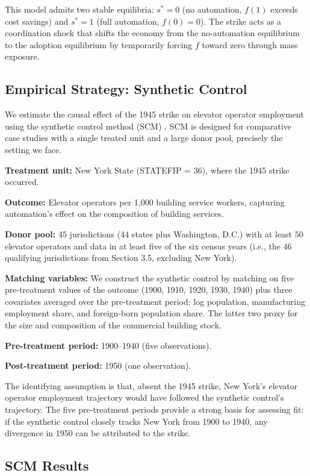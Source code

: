 \documentclass[12pt]{article}
\begin{document}
This model admits two stable equilibria: $s^* = 0$ (no automation, $f(1)$ exceeds cost savings) and $s^* = 1$ (full automation, $f(0) = 0$). The strike acts as a coordination shock that shifts the economy from the no-automation equilibrium to the adoption equilibrium by temporarily forcing $f$ toward zero through mass exposure.

\subsection{Empirical Strategy: Synthetic Control}

We estimate the causal effect of the 1945 strike on elevator operator employment using the synthetic control method (SCM) \citep{abadie2010, abadie2015}. SCM is designed for comparative case studies with a single treated unit and a large donor pool, precisely the setting we face.

\textbf{Treatment unit:} New York State (STATEFIP = 36), where the 1945 strike occurred.

\textbf{Outcome:} Elevator operators per 1,000 building service workers, capturing automation's effect on the composition of building services.

\textbf{Donor pool:} 45 jurisdictions (44 states plus Washington, D.C.) with at least 50 elevator operators and data in at least five of the six census years (i.e., the 46 qualifying jurisdictions from Section 3.5, excluding New York).

\textbf{Matching variables:} We construct the synthetic control by matching on five pre-treatment values of the outcome (1900, 1910, 1920, 1930, 1940) plus three covariates averaged over the pre-treatment period: log population, manufacturing employment share, and foreign-born population share. The latter two proxy for the size and composition of the commercial building stock.

\textbf{Pre-treatment period:} 1900--1940 (five observations).

\textbf{Post-treatment period:} 1950 (one observation).

The identifying assumption is that, absent the 1945 strike, New York's elevator operator employment trajectory would have followed the synthetic control's trajectory. The five pre-treatment periods provide a strong basis for assessing fit: if the synthetic control closely tracks New York from 1900 to 1940, any divergence in 1950 can be attributed to the strike.

\subsection{SCM Results}
\end{document}
